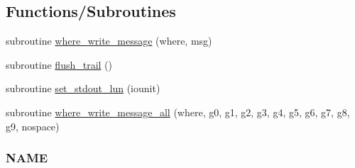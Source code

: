\subsection*{Functions/\+Subroutines}
\begin{DoxyCompactItemize}
\item 
subroutine \mbox{\hyperlink{namespacem__journal_a21238c3fc7731703c75eb39233ab529e}{where\+\_\+write\+\_\+message}} (where, msg)
\item 
subroutine \mbox{\hyperlink{namespacem__journal_a24b891eded8ca585a6a72ab0eef7016c}{flush\+\_\+trail}} ()
\item 
subroutine \mbox{\hyperlink{namespacem__journal_a8388800481a5e7ca022b52cfc56b9daf}{set\+\_\+stdout\+\_\+lun}} (iounit)
\item 
subroutine \mbox{\hyperlink{namespacem__journal_a25d0f5da7f7e84e22ab0a583447412b1}{where\+\_\+write\+\_\+message\+\_\+all}} (where, g0, g1, g2, g3, g4, g5, g6, g7, g8, g9, nospace)
\begin{DoxyCompactList}\small\item\em \subsubsection*{N\+A\+ME}


\end{DoxyCompactList}
\end{DoxyCompactItemize}
